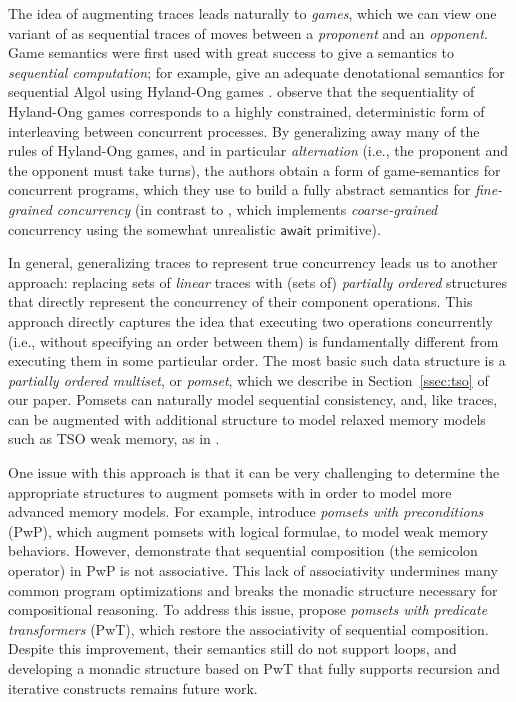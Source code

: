 \documentclass[acmsmall,screen,review]{acmart}
\newcommand{\ms}[1]{\ensuremath{\mathsf{#1}}}
\begin{document}
The idea of augmenting traces leads naturally to \emph{games}, which we can view one variant of as
sequential traces of moves between a \emph{proponent} and an \emph{opponent}. Game semantics were
first used with great success to give a semantics to \emph{sequential computation}; for example,
\citet{abramsky-algol-96} give an adequate denotational semantics for sequential Algol using
Hyland-Ong games \cite{hyland-ong-00}. \citet{ghica-08} observe that the sequentiality of Hyland-Ong
games corresponds to a highly constrained, deterministic form of interleaving between concurrent
processes. By generalizing away many of the rules of Hyland-Ong games, and in particular
\emph{alternation} (i.e., the proponent and the opponent must take turns), the authors obtain a form
of game-semantics for concurrent programs, which they use to build a fully abstract semantics for
\emph{fine-grained concurrency} (in contrast to \citet{brookes-full-abstraction-96}, which
implements \emph{coarse-grained} concurrency using the somewhat unrealistic \ms{await} primitive).

In general, generalizing traces to represent true concurrency leads us to another approach:
replacing sets of \emph{linear} traces with (sets of) \emph{partially ordered} structures that
directly represent the concurrency of their component operations. This approach directly captures
the idea that executing two operations concurrently (i.e., without specifying an order between them)
is fundamentally different from executing them in some particular order. The most basic such data
structure is a \emph{partially ordered multiset}, or \emph{pomset}, which we describe in
Section~\ref{ssec:tso} of our paper. Pomsets can naturally model sequential consistency, and, like
traces, can be augmented with additional structure to model relaxed memory models such as TSO weak
memory, as in \citet{sparky}.

One issue with this approach is that it can be very challenging to determine the appropriate
structures to augment pomsets with in order to model more advanced memory models. For example,
\citet{jagadeesan-pwp-20} introduce \emph{pomsets with preconditions} (PwP), which augment pomsets
with logical formulae, to model weak memory behaviors. However, \citet{leaky-semicolon} demonstrate
that sequential composition (the semicolon operator) in PwP is not associative. This lack of
associativity undermines many common program optimizations and breaks the monadic structure
necessary for compositional reasoning. To address this issue, \citet{leaky-semicolon} propose
\emph{pomsets with predicate transformers} (PwT), which restore the associativity of sequential
composition. Despite this improvement, their semantics still do not support loops, and developing a
monadic structure based on PwT that fully supports recursion and iterative constructs remains future
work. 
\end{document}
